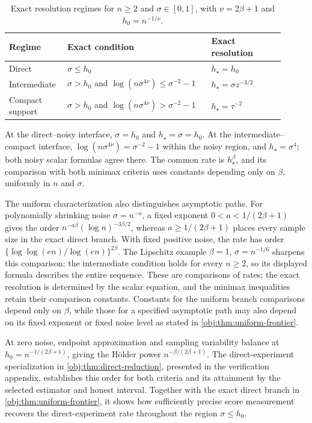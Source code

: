 \documentclass[11pt]{article}
\begin{document}
\begin{table}[htbp]
\centering
\caption{Exact resolution regimes for \(n\ge2\) and \(\sigma\in[0,1]\), with \(\nu=2\beta+1\) and \(h_0=n^{-1/\nu}\).}
\label{tab:noise-regimes}
\begin{tabular}{@{}p{0.17\linewidth}p{0.49\linewidth}p{0.25\linewidth}@{}}
\hline
Regime & Exact condition & Exact resolution \\
\hline
Direct &
\(\sigma\le h_0\) &
\(h_\star=h_0\) \\[0.6em]
Intermediate &
\(\sigma>h_0\) and
\(\log(n\sigma^{4\nu})\le\sigma^{-2}-1\) &
\(h_\star=\sigma z^{-3/2}\) \\[0.6em]
Compact support &
\(\sigma>h_0\) and
\(\log(n\sigma^{4\nu})>\sigma^{-2}-1\) &
\(h_\star=\tau^{-2}\) \\
\hline
\end{tabular}

\smallskip
\parbox{0.95\linewidth}{\small
At the direct--noisy interface, \(\sigma=h_0\) and \(h_\star=\sigma=h_0\).
At the intermediate--compact interface,
\(\log(n\sigma^{4\nu})=\sigma^{-2}-1\) within the noisy region, and
\(h_\star=\sigma^4\); both noisy scalar formulas agree there.
The common rate is \(h_\star^\beta\), and its comparison with both minimax criteria uses constants depending only on \(\beta\), uniformly in \(n\) and \(\sigma\).}
\end{table}

The uniform characterization also distinguishes asymptotic paths. For polynomially shrinking noise \(\sigma=n^{-a}\), a fixed exponent \(0<a<1/(2\beta+1)\) gives the order \(n^{-a\beta}(\log n)^{-3\beta/2}\), whereas \(a\ge1/(2\beta+1)\) places every sample size in the exact direct branch. With fixed positive noise, the rate has order \(\{\log\log(en)/\log(en)\}^{2\beta}\). The Lipschitz example \(\beta=1\), \(\sigma=n^{-1/6}\) sharpens this comparison: the intermediate condition holds for every \(n\ge2\), so its displayed formula describes the entire sequence. These are comparisons of rates; the exact resolution is determined by the scalar equation, and the minimax inequalities retain their comparison constants. Constants for the uniform branch comparisons depend only on \(\beta\), while those for a specified asymptotic path may also depend on its fixed exponent or fixed noise level as stated in \cref{obj:thm:uniform-frontier}.

At zero noise, endpoint approximation and sampling variability balance at \(h_0=n^{-1/(2\beta+1)}\), giving the Hölder power \(n^{-\beta/(2\beta+1)}\). The direct-experiment specialization in \cref{obj:thm:direct-reduction}, presented in the verification appendix, establishes this order for both criteria and its attainment by the selected estimator and honest interval. Together with the exact direct branch in \cref{obj:thm:uniform-frontier}, it shows how sufficiently precise score measurement recovers the direct-experiment rate throughout the region \(\sigma\le h_0\).
\end{document}

